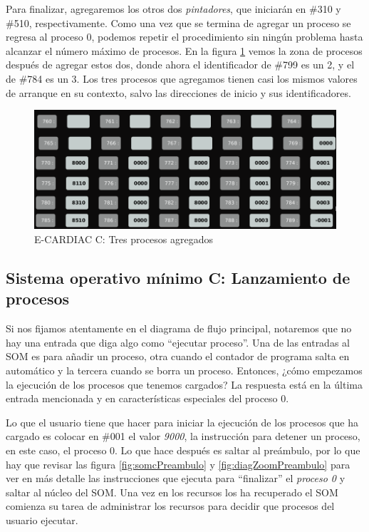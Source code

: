 \documentclass[letterpaper,12pt,oneside]{book}
\begin{document}
		Para finalizar, agregaremos los otros dos \textit{pintadores}, que iniciarán en 
		\#310 y \#510, 
		respectivamente. Como una vez que se termina de agregar un proceso se regresa al proceso 0, podemos repetir el procedimiento sin ningún problema
		hasta alcanzar el número máximo de procesos. En la figura \ref{fig:eccTresProcessoAgregados} vemos la zona
		de procesos después de agregar estos dos, donde ahora el identificador de \#799 es un 2, y el de \#784 es
		un 3. Los tres procesos que agregamos tienen casi los mismos valores de arranque en su contexto, salvo las direcciones de inicio
		y sus identificadores.
		
		
		\begin{figure}[h]		
			\centering
			\includegraphics[scale=0.45]{media/CARDIACC/eccZP3procesosadded.png}
			\caption{E-CARDIAC C: Tres procesos agregados }
			\label{fig:eccTresProcessoAgregados}
		\end{figure}					
		
		\clearpage
		
		\subsection{Sistema operativo mínimo C: Lanzamiento de procesos}
  
		
		
		Si nos fijamos atentamente en el diagrama de flujo principal, notaremos que no hay una entrada que diga algo como ``ejecutar proceso''. 
		Una
		de las entradas al SOM es para añadir un proceso, otra cuando el contador de programa salta en automático y la tercera cuando se borra
		un proceso. Entonces, ¿cómo empezamos la ejecución de los procesos que tenemos cargados? La respuesta está en la última entrada mencionada y
		en características especiales del proceso 0. 
		
		Lo que el usuario tiene que hacer para iniciar la ejecución de los procesos
		que ha cargado es colocar en \#001 el valor \textit{9000}, la instrucción para detener un proceso, en este caso, el proceso 0. Lo que hace 
		después
		es saltar al preámbulo, por lo que hay que revisar las figura \ref{fig:somcPreambulo}
		y \ref{fig:diagZoomPreambulo} para ver en más detalle las instrucciones que ejecuta para ``finalizar''
		el \textit{proceso 0} y saltar al núcleo del SOM. Una vez en los recursos los ha recuperado el SOM comienza su tarea de administrar
		los recursos para decidir que procesos del usuario ejecutar.
		
\end{document}
